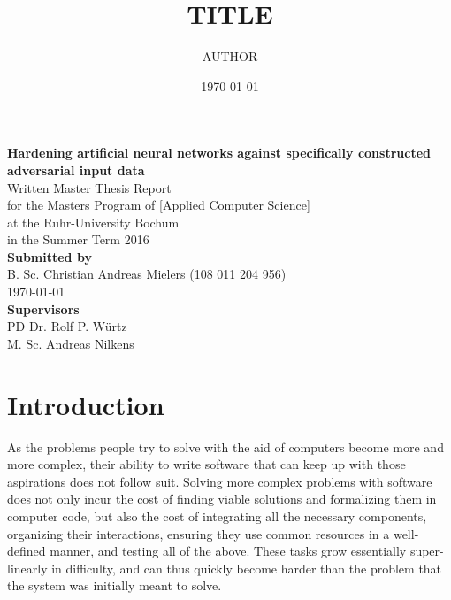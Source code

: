 \documentclass[11pt, a4paper]{article}
\title{TITLE}
\author{AUTHOR}
\date{\today}
\begin{document}
\thispagestyle{empty}

\begin{titlepage}
    \begin{center}
    \vphantom{0cm}
    \huge \textbf{Hardening artificial neural networks against specifically constructed adversarial input data} \\
    \vspace{4cm}
    \normalsize
    Written Master Thesis Report \\
    for the Masters Program of \textcolor{AI-BLUE}{[Applied Computer Science]}\\
    at the Ruhr-University Bochum\\
    in the Summer Term 2016\\
    \vspace{4cm}
    \textbf{Submitted by}\\
    B. Sc. Christian Andreas Mielers (108 011 204 956)\\
    \vspace{1cm}
    \today \\
    \vspace{1cm}
    \textbf{Supervisors} \\
    PD Dr. Rolf P. Würtz \\
    M. Sc. Andreas Nilkens
    \end{center}
\end{titlepage}

\newpage
{}
\setcounter{page}{2}

\tableofcontents

\newpage
\section{Introduction}
\label{sec:introduction}

As the problems people try to solve with the aid of computers become more and more complex, their ability to write software that can keep up with those aspirations does not follow suit. Solving more complex problems with software does not only incur the cost of finding viable solutions and formalizing them in computer code, but also the cost of integrating all the necessary components, organizing their interactions, ensuring they use common resources in a well-defined manner, and testing all of the above. These tasks grow essentially super-linearly in difficulty, and can thus quickly become harder than the problem that the system was initially meant to solve.
\end{document}
